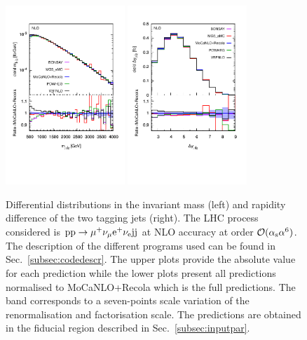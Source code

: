  \begin{figure}[hbt!]
   \centering
   \includegraphics[width=0.4\textwidth,angle=0,clip=true,trim={0.4cm 2cm 0.cm 1.cm}]{figures/NLO/mjj_NLO.pdf}
   \includegraphics[width=0.4\textwidth,angle=0,clip=true,trim={0.4cm 2cm 0.cm 1.cm}]{figures/NLO/dyj1j2_NLO.pdf}
\caption{\label{fig:distNLO1} Differential distributions in the invariant mass (left) and rapidity difference of the two tagging jets (right).
The LHC process considered is ${\rm p}{\rm p}\to\mu^+\nu_\mu{\rm e}^+\nu_{\rm e}{\rm j}{\rm j}$ at NLO accuracy at order $\mathcal{O}(\alpha_{\rm s}\alpha^6)$.
The description of the different programs used can be found in Sec.~\ref{subsec:codedescr}.
The upper plots provide the absolute value for each prediction while the lower plots present all predictions normalised to {\sc MoCaNLO}+{\sc Recola} which is the full predictions.
The band corresponds to a seven-points scale variation of the renormalisation and factorisation scale.
The predictions are obtained in the fiducial region described in Sec.~\ref{subsec:inputpar}.
}
\end{figure}

